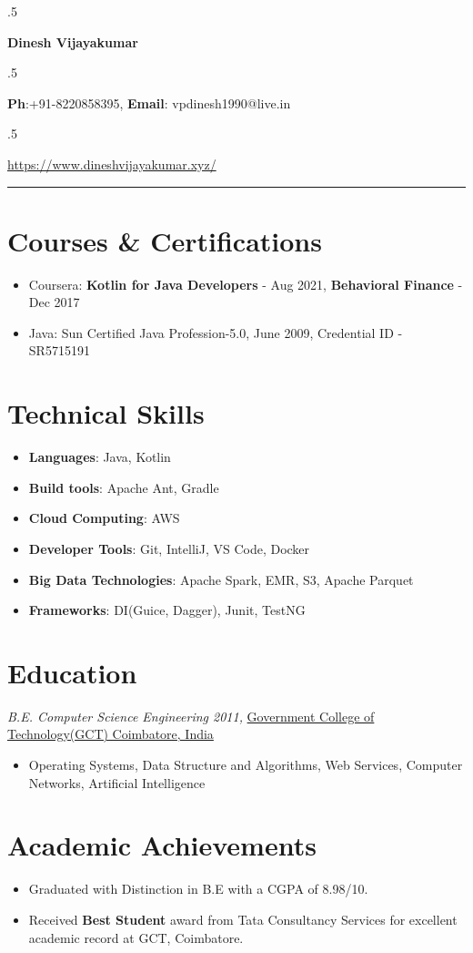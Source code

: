 \documentclass[10pt]{article}
\begin{document}
\moveleft.5\hoffset\centerline{\huge\bf Dinesh Vijayakumar} %
\moveleft.5\hoffset\centerline{{\bf Ph}:+91-8220858395, {\bf Email}: vpdinesh1990@live.in}
\moveleft.5\hoffset\centerline{\href{https://www.dineshvijayakumar.xyz/}{https://www.dineshvijayakumar.xyz/}}
\hrule

\begin{minipage}[t]{0.40\textwidth}
\vspace{5pt}

\section*{Courses \& Certifications}
\begin{itemize}
\item Coursera: {\bf Kotlin for Java Developers} - Aug 2021, {\bf Behavioral Finance} - Dec 2017
\item Java: Sun Certified Java Profession-5.0, June 2009, Credential ID - SR5715191
\end{itemize}

\section*{Technical Skills}
\begin{itemize}
\item {\bf Languages}: Java, Kotlin
\item {\bf Build tools}: Apache Ant, Gradle
\item {\bf Cloud Computing}: AWS
\item {\bf Developer Tools}: Git, IntelliJ, VS Code, Docker
\item {\bf Big Data Technologies}: Apache Spark, EMR, S3, Apache Parquet
\item {\bf Frameworks}: DI(Guice, Dagger), Junit, TestNG 
\end{itemize}
\section*{Education}
{\sl B.E. Computer Science Engineering 2011,} \href{https://gct.ac.in/}{Government College of Technology(GCT) Coimbatore, India} 
\begin{itemize}
\item Operating Systems, Data Structure and Algorithms, Web Services, Computer Networks, Artificial Intelligence
\end{itemize}
 

\section*{Academic Achievements}
\begin{itemize}
\item Graduated with Distinction in B.E with a CGPA of 8.98/10.
\item Received {\bf Best Student} award from Tata Consultancy Services for excellent academic record at GCT, Coimbatore.
\end{itemize}


\end{minipage}
\end{document}
